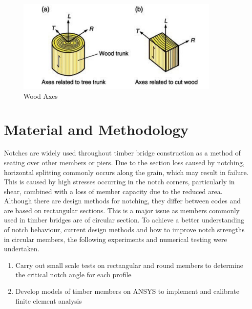 \documentclass[11pt,a4paper]{article}
\numberwithin{equation}{subsection}
\begin{document}
\begin{figure}[h]
	\begin{center}
		\includegraphics[scale=0.9]{Wood_Axes}
	\end{center}
 	\caption{Wood Axes \cite{porteous_structural_2013}}
 	\label{fig:Axes}
\end{figure}

\vspace*{\baselineskip}
\pagebreak

\section{Material and Methodology}
Notches are widely used throughout timber bridge construction as a method of seating over other members or piers. Due to the section loss caused by notching, horizontal splitting commonly occurs along the grain, which may result in failure. This is caused by high stresses occurring in the notch corners, particularly in shear, combined with a loss of member capacity due to the reduced area. Although there are design methods for notching, they differ between codes and are based on rectangular sections. This is a major issue as members commonly used in timber bridges are of circular section. To achieve a better understanding of notch behaviour, current design methods and how to improve notch strengths in circular members, the following experiments and numerical testing were undertaken. 

	\begin{enumerate}
		\item Carry out small scale tests on rectangular and round members to determine the critical notch angle for each profile
		\item Develop models of timber members on ANSYS to implement and calibrate finite element analysis 
	\end{enumerate}
\end{document}
